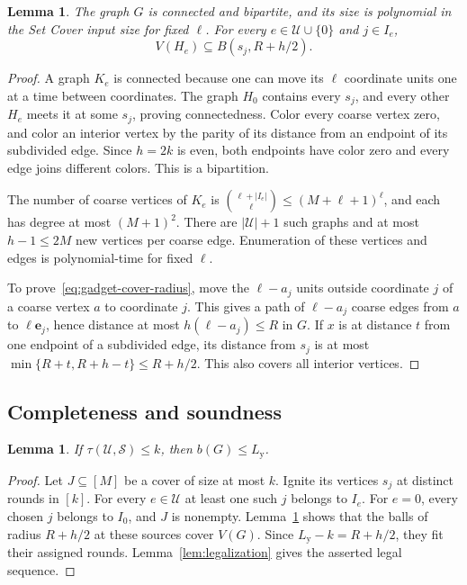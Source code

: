 \documentclass[11pt]{article}
\numberwithin{equation}{section}
\newtheorem{lemma}[theorem]{Lemma}
\theoremstyle{definition}
\begin{document}
\begin{lemma}\label{lem:gadget-geometry}
The graph $G$ is connected and bipartite, and its size is polynomial
in the Set Cover input size for fixed $\ell$.
For every $e\in\mathcal U\cup\{0\}$ and $j\in I_e$,
\begin{equation}\label{eq:gadget-cover-radius}
 V(H_e)\subseteq B(s_j,R+h/2).
\end{equation}
\end{lemma}
\begin{proof}
A graph $K_e$ is connected because one can move its $\ell$ coordinate
units one at a time between coordinates. The graph $H_0$ contains every
$s_j$, and every other $H_e$ meets it at some $s_j$, proving
connectedness. Color every coarse vertex zero, and color an interior
vertex by the parity of its distance from an endpoint of its subdivided
edge. Since $h=2k$ is even, both endpoints have color zero and every edge
joins different colors. This is a bipartition.

The number of coarse vertices of $K_e$ is
$\binom{\ell+|I_e|}{\ell}\le(M+\ell+1)^\ell$, and each has degree at
most $(M+1)^2$. There are $|\mathcal U|+1$ such graphs and at most
$h-1\le2M$ new vertices per coarse edge. Enumeration of these vertices
and edges is polynomial-time for fixed $\ell$.

To prove~\eqref{eq:gadget-cover-radius}, move the $\ell-a_j$ units
outside coordinate $j$ of a coarse vertex $a$ to coordinate $j$.
This gives a path of $\ell-a_j$ coarse edges from $a$ to
$\ell\mathbf e_j$, hence distance at most $h(\ell-a_j)\le R$ in $G$.
If $x$ is at distance $t$ from one endpoint of a subdivided edge, its
distance from $s_j$ is at most
$\min\{R+t,R+h-t\}\le R+h/2$. This also covers all interior vertices.
\end{proof}

\subsection{Completeness and soundness}

\begin{lemma}\label{lem:hardness-completeness}
If $\tau(\mathcal U,\mathcal S)\le k$, then $b(G)\le L_{\mathrm y}$.
\end{lemma}
\begin{proof}
Let $J\subseteq[M]$ be a cover of size at most $k$.
Ignite its vertices $s_j$ at distinct rounds in $[k]$.
For every $e\in\mathcal U$ at least one such $j$ belongs to $I_e$.
For $e=0$, every chosen $j$ belongs to $I_0$, and $J$ is nonempty.
Lemma~\ref{lem:gadget-geometry} shows that the balls of radius $R+h/2$
at these sources cover $V(G)$. Since
$L_{\mathrm y}-k=R+h/2$, they fit their assigned rounds.
Lemma~\ref{lem:legalization} gives the asserted legal sequence.
\end{proof}
\end{document}
